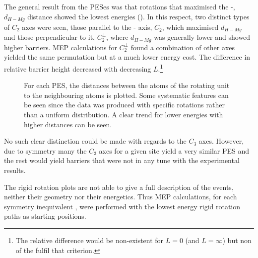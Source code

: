 The general result from the PESes was that rotations that maximised the -, $d_{H-Mg}$ distance showed the lowest energies ().
In this respect, two distinct types of $C_2$ axes were seen, those parallel to the - axis, $C_2^\parallel$, which maximised $d_{H-Mg}$ and those perpendicular to it, $C_2^\perp$, where $d_{H-Mg}$ was generally lower and showed higher barriers.
MEP calculations for $C_2^\perp$ found a combination of other axes yielded the same permutation but at a much lower energy cost.
The difference in relative barrier height decreased with decreasing $L$.\footnote{The relative difference would be non-existent for $L=0$ (and $L=\infty$) but non of the  fulfil that criterion.}

\begin{figure}[htb]
\begin{center}
    \parbox{0.85\linewidth}{
      \caption{For each PES, the distances between the  atoms of the rotating  unit to the neighbouring  atoms is plotted.
Some systematic features can be seen since the data was produced with specific rotations rather than a uniform distribution.
A clear trend for lower energies with higher distances can be seen.
      }
      \label{fig:h-mg-distances}
    }
\end{center}
\end{figure}

No such clear distinction could be made with regards to the $C_3$ axes.
However, due to symmetry many the $C_3$ axes for a given site yield a very similar PES and the rest would yield barriers that were not in any tune with the experimental results.

The rigid rotation plots are not able to give a full description of the events, neither their geometry nor their energetics.
Thus MEP calculations, for each symmetry inequivalent , were performed with the lowest energy rigid rotation paths as starting positions.

